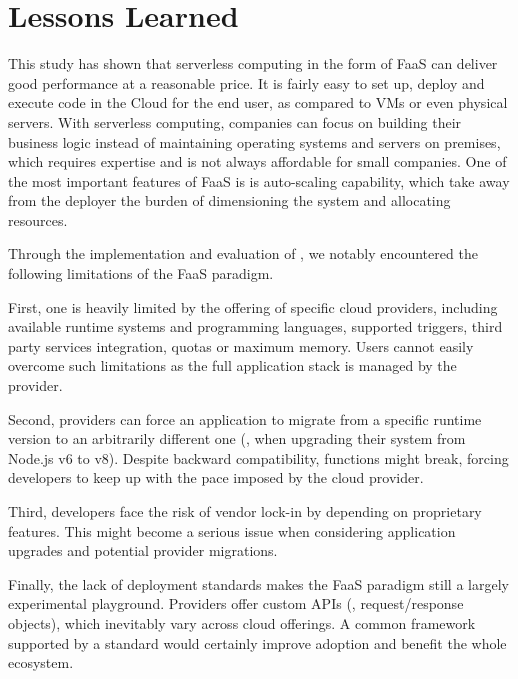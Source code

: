 
\section{Lessons Learned}
\label{sec:lessons}

This study has shown that serverless computing in the form of \gls{FaaS} can deliver good performance at a reasonable price.
It is fairly easy to set up, deploy and execute code in the Cloud for the end user, as compared to \gls{VM}s or even physical servers.
With serverless computing, companies can focus on building their business logic instead of maintaining operating systems and servers on premises, which requires expertise and is not always affordable for small companies.
One of the most important features of \gls{FaaS} is is auto-scaling capability, which take away from the deployer the burden of dimensioning the system and allocating resources.

Through the implementation and evaluation of \sys, we notably encountered the following limitations of the FaaS paradigm. 

First, one is heavily limited by the offering of specific cloud providers, including available runtime systems and programming languages, supported triggers, third party  services integration, quotas or maximum memory. 
Users cannot easily overcome such limitations as the full application stack is managed by the provider.

Second, providers can force an application to migrate from a specific runtime version to an arbitrarily different one (\eg, when upgrading their system from Node.js v6 to v8).
Despite backward compatibility, functions might break, forcing developers to keep up with the pace imposed by the cloud provider.

Third, developers face the risk of vendor lock-in by depending on proprietary features.
This might become a serious issue when considering application upgrades and potential provider migrations.

Finally, the lack of deployment standards makes the FaaS paradigm still a largely experimental playground.
Providers offer custom APIs (\eg, request/response objects), which inevitably vary across cloud offerings.
A common framework supported by a standard would certainly improve adoption and benefit the whole ecosystem.



